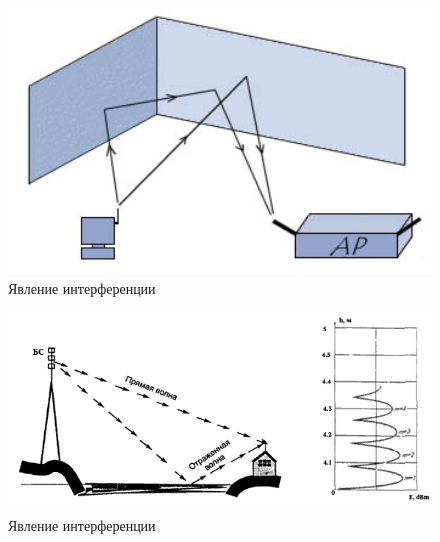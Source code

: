 \documentclass[a4paper,12pt]{article} %
\begin{document}
\begin{figure}
\centering
\includegraphics[width=12cm]{4. interferention}
\caption{Явление интерференции}
\end{figure}

\begin{figure}
\centering
\includegraphics[width=12cm]{5. interference}
\caption{Явление интерференции}
\end{figure}
\end{document}
